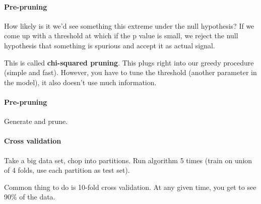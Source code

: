 \paragraph{Pre-pruning} How likely is it we'd see something this extreme under the null hypothesis? If we come up with a threshold at which if the p value is small, we reject the null hypothesis that something is spurious and accept it as actual signal.

This is called \textbf{chi-squared pruning}. This plugs right into our greedy procedure (simple and fast). However, you have to tune the threshold (another parameter in the model), it also doesn't use much information.

\paragraph{Pre-pruning} Generate and prune.

\paragraph{Cross validation} Take a big data set, chop into partitions. Run algorithm 5 times (train on union of 4 folds, use each partition as test set).

Common thing to do is 10-fold cross validation. At any given time, you get to see 90\% of the data.

